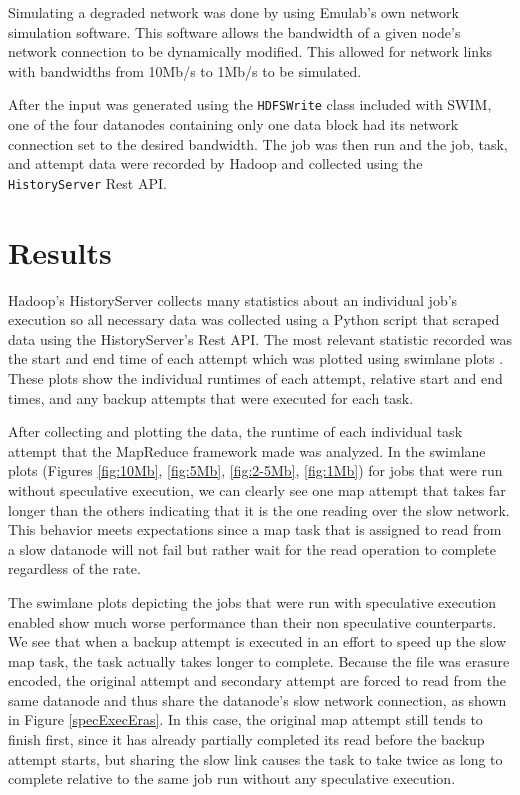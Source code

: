 \documentclass{ucetd}
\newcommand{\code}[1]{\texttt{#1}}
\begin{document}
Simulating a degraded network was done by using Emulab's own network simulation
software. This software allows the bandwidth of a given node's network
connection to be dynamically modified. This allowed for network links with
bandwidths from 10Mb/s to 1Mb/s to be simulated.

After the input was generated using the \code{HDFSWrite} class included with
SWIM, one of the four datanodes containing only one data block had its network
connection set to the desired bandwidth. The job was then run and the job, task,
and attempt data were recorded by Hadoop and collected using the
\code{HistoryServer} Rest API.

\section{Results}

Hadoop's HistoryServer collects many statistics about an individual job's
execution so all necessary data was collected using a Python script that scraped
data using the HistoryServer's Rest API. The most relevant statistic recorded
was the start and end time of each attempt which was plotted using swimlane
plots \cite{Tan}. These plots show the individual runtimes of each attempt,
relative start and end times, and any backup attempts that were executed for
each task. 

After collecting and plotting the data, the runtime of each individual task
attempt that the MapReduce framework made was analyzed. In the swimlane plots
(Figures \ref{fig:10Mb}, \ref{fig:5Mb}, \ref{fig:2-5Mb}, \ref{fig:1Mb})
for jobs that were run without speculative execution, we can clearly see one map
attempt that takes far longer than the others indicating that it is the one
reading over the slow network. This behavior meets expectations since a map task
that is assigned to read from a slow datanode will not fail but rather wait for
the read operation to complete regardless of the rate.

The swimlane plots depicting the jobs that were run with speculative execution
enabled show much worse performance than their non speculative counterparts. We
see that when a backup attempt is executed in an effort to speed up the slow map
task, the task actually takes longer to complete. Because the file was erasure
encoded, the original attempt and secondary attempt are forced to read from the
same datanode and thus share the datanode's slow network connection, as shown in
Figure \ref{specExecEras}. In this case, the original map attempt still tends to
finish first, since it has already partially completed its read before the
backup attempt starts, but sharing the slow link causes the task to take twice
as long to complete relative to the same job run without any speculative
execution.
\end{document}
